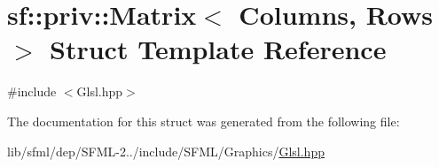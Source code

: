 \hypertarget{structsf_1_1priv_1_1_matrix}{\section{sf\-:\-:priv\-:\-:Matrix$<$ Columns, Rows $>$ Struct Template Reference}
\label{structsf_1_1priv_1_1_matrix}
}


{\ttfamily \#include $<$Glsl.\-hpp$>$}



The documentation for this struct was generated from the following file\-:\begin{DoxyCompactItemize}
\item 
lib/sfml/dep/\-S\-F\-M\-L-\/2../include/\-S\-F\-M\-L/\-Graphics/\hyperlink{_glsl_8hpp}{Glsl.\-hpp}\end{DoxyCompactItemize}
